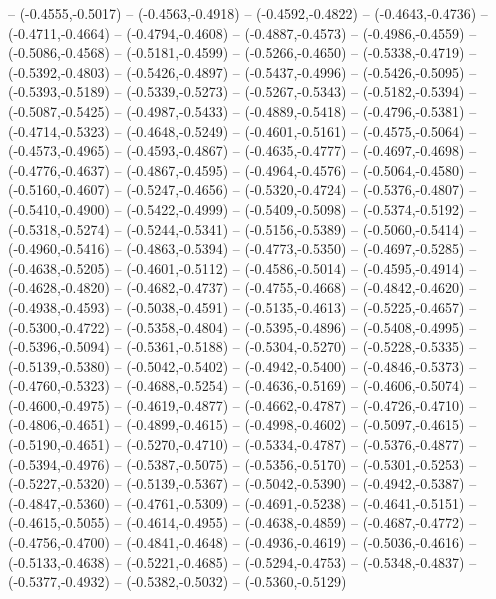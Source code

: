 {	-- (-0.4555,-0.5017)
	-- (-0.4563,-0.4918)
	-- (-0.4592,-0.4822)
	-- (-0.4643,-0.4736)
	-- (-0.4711,-0.4664)
	-- (-0.4794,-0.4608)
	-- (-0.4887,-0.4573)
	-- (-0.4986,-0.4559)
	-- (-0.5086,-0.4568)
	-- (-0.5181,-0.4599)
	-- (-0.5266,-0.4650)
	-- (-0.5338,-0.4719)
	-- (-0.5392,-0.4803)
	-- (-0.5426,-0.4897)
	-- (-0.5437,-0.4996)
	-- (-0.5426,-0.5095)
	-- (-0.5393,-0.5189)
	-- (-0.5339,-0.5273)
	-- (-0.5267,-0.5343)
	-- (-0.5182,-0.5394)
	-- (-0.5087,-0.5425)
	-- (-0.4987,-0.5433)
	-- (-0.4889,-0.5418)
	-- (-0.4796,-0.5381)
	-- (-0.4714,-0.5323)
	-- (-0.4648,-0.5249)
	-- (-0.4601,-0.5161)
	-- (-0.4575,-0.5064)
	-- (-0.4573,-0.4965)
	-- (-0.4593,-0.4867)
	-- (-0.4635,-0.4777)
	-- (-0.4697,-0.4698)
	-- (-0.4776,-0.4637)
	-- (-0.4867,-0.4595)
	-- (-0.4964,-0.4576)
	-- (-0.5064,-0.4580)
	-- (-0.5160,-0.4607)
	-- (-0.5247,-0.4656)
	-- (-0.5320,-0.4724)
	-- (-0.5376,-0.4807)
	-- (-0.5410,-0.4900)
	-- (-0.5422,-0.4999)
	-- (-0.5409,-0.5098)
	-- (-0.5374,-0.5192)
	-- (-0.5318,-0.5274)
	-- (-0.5244,-0.5341)
	-- (-0.5156,-0.5389)
	-- (-0.5060,-0.5414)
	-- (-0.4960,-0.5416)
	-- (-0.4863,-0.5394)
	-- (-0.4773,-0.5350)
	-- (-0.4697,-0.5285)
	-- (-0.4638,-0.5205)
	-- (-0.4601,-0.5112)
	-- (-0.4586,-0.5014)
	-- (-0.4595,-0.4914)
	-- (-0.4628,-0.4820)
	-- (-0.4682,-0.4737)
	-- (-0.4755,-0.4668)
	-- (-0.4842,-0.4620)
	-- (-0.4938,-0.4593)
	-- (-0.5038,-0.4591)
	-- (-0.5135,-0.4613)
	-- (-0.5225,-0.4657)
	-- (-0.5300,-0.4722)
	-- (-0.5358,-0.4804)
	-- (-0.5395,-0.4896)
	-- (-0.5408,-0.4995)
	-- (-0.5396,-0.5094)
	-- (-0.5361,-0.5188)
	-- (-0.5304,-0.5270)
	-- (-0.5228,-0.5335)
	-- (-0.5139,-0.5380)
	-- (-0.5042,-0.5402)
	-- (-0.4942,-0.5400)
	-- (-0.4846,-0.5373)
	-- (-0.4760,-0.5323)
	-- (-0.4688,-0.5254)
	-- (-0.4636,-0.5169)
	-- (-0.4606,-0.5074)
	-- (-0.4600,-0.4975)
	-- (-0.4619,-0.4877)
	-- (-0.4662,-0.4787)
	-- (-0.4726,-0.4710)
	-- (-0.4806,-0.4651)
	-- (-0.4899,-0.4615)
	-- (-0.4998,-0.4602)
	-- (-0.5097,-0.4615)
	-- (-0.5190,-0.4651)
	-- (-0.5270,-0.4710)
	-- (-0.5334,-0.4787)
	-- (-0.5376,-0.4877)
	-- (-0.5394,-0.4976)
	-- (-0.5387,-0.5075)
	-- (-0.5356,-0.5170)
	-- (-0.5301,-0.5253)
	-- (-0.5227,-0.5320)
	-- (-0.5139,-0.5367)
	-- (-0.5042,-0.5390)
	-- (-0.4942,-0.5387)
	-- (-0.4847,-0.5360)
	-- (-0.4761,-0.5309)
	-- (-0.4691,-0.5238)
	-- (-0.4641,-0.5151)
	-- (-0.4615,-0.5055)
	-- (-0.4614,-0.4955)
	-- (-0.4638,-0.4859)
	-- (-0.4687,-0.4772)
	-- (-0.4756,-0.4700)
	-- (-0.4841,-0.4648)
	-- (-0.4936,-0.4619)
	-- (-0.5036,-0.4616)
	-- (-0.5133,-0.4638)
	-- (-0.5221,-0.4685)
	-- (-0.5294,-0.4753)
	-- (-0.5348,-0.4837)
	-- (-0.5377,-0.4932)
	-- (-0.5382,-0.5032)
	-- (-0.5360,-0.5129)
}
